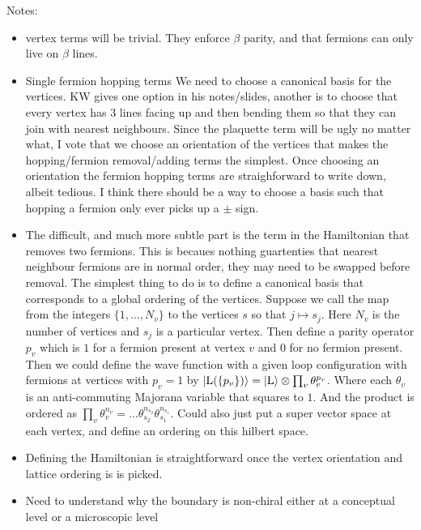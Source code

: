 \documentclass[12pt,a4paper]{article}
\newcommand{\ket}[1]{\ensuremath{\left|#1\right\rangle}}
\begin{document}
{{Notes:
\begin{itemize}
\item vertex terms will be trivial. They enforce $\beta$ parity, and that fermions can only live on $\beta$ lines. 
\item Single fermion hopping terms
We need to choose a canonical basis for the vertices. KW gives one option in his notes/slides, another is to choose that every vertex has 3 lines facing up and then bending them so that they can join with nearest neighbours. Since the plaquette term will be ugly no matter what, I vote that we choose an orientation of the vertices that makes the hopping/fermion removal/adding terms the simplest. 
Once choosing an orientation the fermion hopping terms are straighforward to write down, albeit tedious. 
I think there should be a way to choose a basis such that hopping a fermion only ever picks up a $\pm$ sign. 
\item The difficult, and much more subtle part is the term in the Hamiltonian that removes two fermions. This is becaues nothing guartenties that nearest neighbour fermions are in normal order, they may need to be swapped before removal. 
The simplest thing to do is to define a canonical basis that corresponds to a global ordering of the vertices.
Suppose we call the map from the integers $\{ 1, \hdots, N_v \}$ to the vertices $s$ so that $j \mapsto s_j$. Here $N_v$ is the number of vertices and $s_j$ is a particular vertex. 
Then define a parity operator $p_v$ which is $1$ for a fermion present at vertex $v$ and $0$ for no fermion present. Then we could define the wave function with a given loop configuration { } with fermions at vertices with $p_v =1$ by $\ket{\text{\cal L}(\{p_v \}) } = \ket{\text{\cal L}} \otimes \prod_v \theta_v^{p_v}$. 
Where each $\theta_v$ is an anti-commuting Majorana variable that squares to $1$. And the product is ordered as $\prod_v \theta_v^{n_v} =\hdots \theta_{s_2}^{n_{s_2}} \theta_{s_1}^{n_{s_1}}$.
Could also just put a super vector space at each vertex, and define an ordering on this hilbert space. 
\item Defining the Hamiltonian is straightforward once the vertex orientation and lattice ordering is is picked.  
\item Need to understand why the boundary is non-chiral either at a conceptual level or a microscopic level
\end{itemize}
}}
\end{document}
